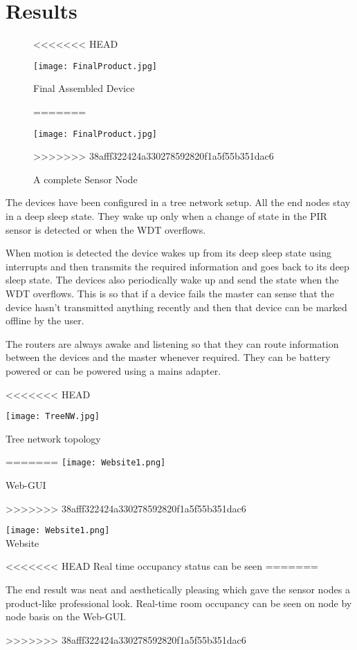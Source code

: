 \chapter{Results}

\begin{figure}[ht]
<<<<<<< HEAD
	\begin{center}
		
		\texttt{[image: FinalProduct.jpg]}
		
		\caption{Final Assembled Device}
		
		\end{center}
=======
\begin{center}

\texttt{[image: FinalProduct.jpg]}

\caption{A complete Sensor Node}

\end{center}
>>>>>>> 38afff322424a330278592820f1a5f55b351dac6
\end{figure}

The devices have been configured in a tree network setup. All the end nodes stay in a deep sleep state. They wake up only when a change of state in the PIR sensor is detected or when the WDT overflows. 

When motion is detected the device wakes up from its deep sleep state using interrupts and then transmits the required information and goes back to its deep sleep state. 
The devices also periodically wake up and send the state when the WDT overflows. This is so that if a device fails the master can sense that the device hasn't transmitted anything recently and then that device can be marked offline by the user.

The routers are always awake and listening so that they can route information between the devices and the master whenever required. They can be battery powered or can be powered using a mains adapter.

<<<<<<< HEAD
\begin{center}
	\texttt{[image: TreeNW.jpg]}
	
	Tree network topology
\end{center}
=======
\texttt{[image: Website1.png]}
\caption{Web-GUI}
>>>>>>> 38afff322424a330278592820f1a5f55b351dac6

\begin{center}
	\texttt{[image: Website1.png]}
	\\Website
\end{center}

<<<<<<< HEAD
Real time occupancy status can be seen 
=======
\par The end result was neat and aesthetically pleasing which gave the sensor nodes a product-like professional look. Real-time room occupancy can be seen on node by node basis on the Web-GUI.

>>>>>>> 38afff322424a330278592820f1a5f55b351dac6



